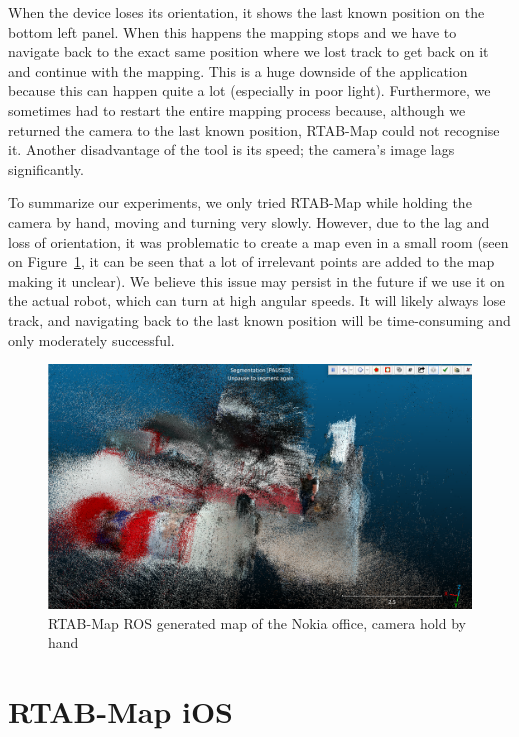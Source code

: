 When the device loses its orientation, it shows the last known position on the bottom left panel. When this happens the mapping stops and we have to navigate back to the exact same position where we lost track to get back on it and continue with the mapping. This is a huge downside of the application because this can happen quite a lot (especially in poor light). Furthermore, we sometimes had to restart the entire mapping process because, although we returned the camera to the last known position, RTAB-Map could not recognise it. Another disadvantage of the tool is its speed; the camera's image lags significantly.

To summarize our experiments, we only tried RTAB-Map while holding the camera by hand, moving and turning very slowly. However, due to the lag and loss of orientation, it was problematic to create a map even in a small room (seen on Figure~\ref{fig:rtabmap_nokia}, it can be seen that a lot of irrelevant points are added to the map making it unclear). We believe this issue may persist in the future if we use it on the actual robot, which can turn at high angular speeds. It will likely always lose track, and navigating back to the last known position will be time-consuming and only moderately successful.

\begin{figure}[H]
	\centering
	\includegraphics[width=150mm, keepaspectratio]{figures/rtabmap_nokia_office.png}
	\caption{RTAB-Map ROS generated map of the Nokia office, camera hold by hand}
	\label{fig:rtabmap_nokia}
\end{figure}

\FloatBarrier
\section{RTAB-Map iOS}

